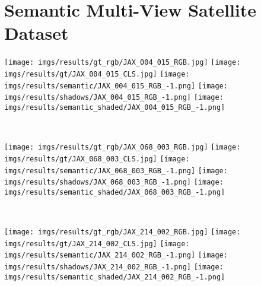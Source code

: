 \section{Semantic Multi-View Satellite Dataset}

\begin{figure*}[ht]
	\centering
	\begin{minipage}{0.015\linewidth}
		\centering
	\end{minipage}
	\begin{minipage}{0.98\linewidth}
		\centering
		\texttt{[image: imgs/results/gt\_rgb/JAX\_004\_015\_RGB.jpg]}
		\hfill
		\texttt{[image: imgs/results/gt/JAX\_004\_015\_CLS.jpg]}
		\hfill
		\texttt{[image: imgs/results/semantic/JAX\_004\_015\_RGB\_-1.png]}
		\hfill
		\texttt{[image: imgs/results/shadows/JAX\_004\_015\_RGB\_-1.png]}
		\hfill
		\texttt{[image: imgs/results/semantic\_shaded/JAX\_004\_015\_RGB\_-1.png]}\\
	\end{minipage}\\
	
	\vspace{0.2 cm}
	\begin{minipage}{0.015\linewidth}
		\centering
	\end{minipage}
	\begin{minipage}{0.98\linewidth}
		\centering
		\texttt{[image: imgs/results/gt\_rgb/JAX\_068\_003\_RGB.jpg]}
		\hfill
		\texttt{[image: imgs/results/gt/JAX\_068\_003\_CLS.jpg]}
		\hfill
		\texttt{[image: imgs/results/semantic/JAX\_068\_003\_RGB\_-1.png]}
		\hfill
		\texttt{[image: imgs/results/shadows/JAX\_068\_003\_RGB\_-1.png]}
		\hfill
		\texttt{[image: imgs/results/semantic\_shaded/JAX\_068\_003\_RGB\_-1.png]}\\
	\end{minipage}\\
	
	
	
	\vspace{0.2 cm}
	\begin{minipage}{0.015\linewidth}
		\centering
	\end{minipage}
	\begin{minipage}{0.98\linewidth}
		\centering
		\texttt{[image: imgs/results/gt\_rgb/JAX\_214\_002\_RGB.jpg]}
		\hfill
		\texttt{[image: imgs/results/gt/JAX\_214\_002\_CLS.jpg]}
		\hfill
		\texttt{[image: imgs/results/semantic/JAX\_214\_002\_RGB\_-1.png]}
		\hfill
		\texttt{[image: imgs/results/shadows/JAX\_214\_002\_RGB\_-1.png]}
		\hfill
		\texttt{[image: imgs/results/semantic\_shaded/JAX\_214\_002\_RGB\_-1.png]}\\
	\end{minipage}\\
	

\end{figure*}

